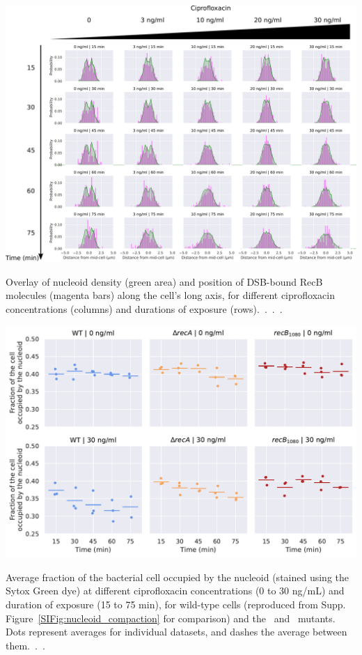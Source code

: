 \begin{suppfigure*}[htbp]
    \begin{center}
    \includegraphics[width=\textwidth]{SI_Figures/RecB_Nucleoid_position_timepoints.pdf}
    \end{center}
    \caption{Overlay of nucleoid density (green area) and position of DSB-bound RecB molecules (magenta bars) along the cell's long axis, for different ciprofloxacin concentrations (columns) and durations of exposure (rows).\ .\ .\ .}\label{SIFig:recb_nucleoid_timepoints}
\end{suppfigure*}

\begin{suppfigure*}[htbp]
    \begin{center}
    \includegraphics[width=.8\textwidth]{SI_Figures/Mutants_nucleoid_compaction.pdf}
    \end{center}
    \caption{Average fraction of the bacterial cell occupied by the nucleoid (stained using the Sytox Green dye) at different ciprofloxacin concentrations (0 to 30 ng/mL) and duration of exposure (15 to 75 min), for wild-type cells (reproduced from Supp. Figure~\ref{SIFig:nucleoid_compaction} for comparison) and the \dreca\ and \geneteneighty\ mutants. Dots represent averages for individual datasets, and dashes the average between them.\ .\ .}\label{SIFig:mutants_nucleoid_compaction}
\end{suppfigure*}
